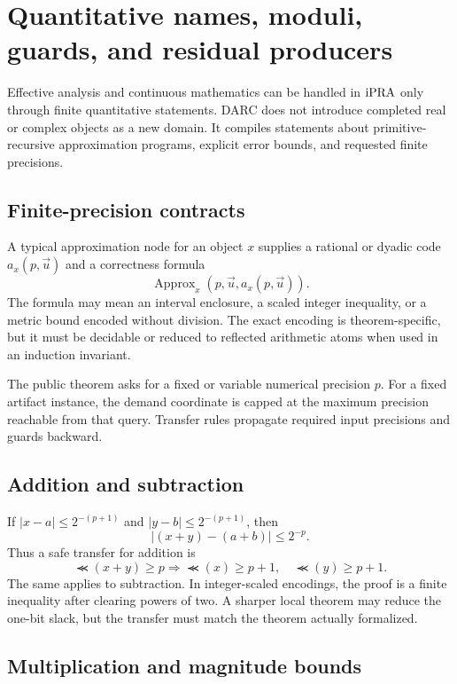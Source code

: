 \section{Quantitative names, moduli, guards, and residual producers}
\label{sec:quantitative}

Effective analysis and continuous mathematics can be handled in \(\mathrm{iPRA}\) only
through finite quantitative statements.  DARC does not introduce completed
real or complex objects as a new domain.  It compiles statements about
primitive-recursive approximation programs, explicit error bounds, and
requested finite precisions.

\subsection{Finite-precision contracts}

A typical approximation node for an object \(x\) supplies a rational or dyadic
code \(a_x(p,\vec u)\) and a correctness formula
\[
  \operatorname{Approx}_x(p,\vec u,a_x(p,\vec u)).
\]
The formula may mean an interval enclosure, a scaled integer inequality, or a
metric bound encoded without division.  The exact encoding is theorem-specific,
but it must be decidable or reduced to reflected arithmetic atoms when used in
an induction invariant.

The public theorem asks for a fixed or variable numerical precision \(p\).
For a fixed artifact instance, the demand coordinate is capped at the maximum
precision reachable from that query.  Transfer rules propagate required input
precisions and guards backward.

\subsection{Addition and subtraction}

If \(|x-a|\le 2^{-(p+1)}\) and
\(|y-b|\le 2^{-(p+1)}\), then
\[
  |(x+y)-(a+b)|\le 2^{-p}.
\]
Thus a safe transfer for addition is
\[
  \Prec(x+y)\ge p
  \Longrightarrow
  \Prec(x)\ge p+1,\quad\Prec(y)\ge p+1.
\]
The same applies to subtraction.  In integer-scaled encodings, the proof is a
finite inequality after clearing powers of two.  A sharper local theorem may
reduce the one-bit slack, but the transfer must match the theorem actually
formalized.

\subsection{Multiplication and magnitude bounds}

